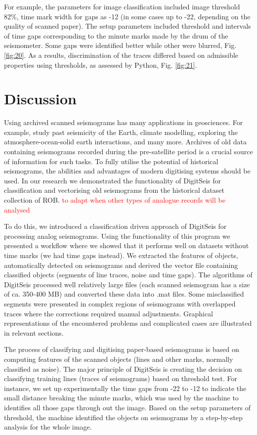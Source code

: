 \documentclass[informatics,article,submit,moreauthors,pdftex]{Definitions/mdpi}
\begin{document}
For example, the parameters for image classification included image threshold 82\%, time mark width for gaps as -12 (in some cases up to -22, depending on the quality of scanned paper). The setup parameters included threshold and intervals of time gaps corresponding to the minute marks made by the drum of the seismometer. Some gaps were identified better while other were blurred, Fig. \ref{fig:20}. As a results, discrimination of the traces differed based on admissible properties using thresholds, as assessed by Python, Fig. \ref{fig:21}. 

\section{Discussion}

Using archived scanned seismograms has many applications in geosciences. For example, study past seismicity of the Earth, climate modelling, exploring the atmosphere-ocean-solid earth interactions, and many more. Archives of old data containing seismograms recorded during the pre-satellite period is a crucial source of information for such tasks. To fully utilise the potential of historical seismograms, the abilities and advantages of modern digitising systems should be used. In our research we demonstrated the functionality of DigitSeis for classification and vectorising old seismograms from the historical dataset collection of \ac{ROB}. \textcolor{red}{to adapt when other types of analogue records will be analysed}

To do this, we introduced a classification driven approach of DigitSeis for processing analog seismograms. Using the functionality of this program we presented a workflow where we showed that it performs well on datasets without time marks (we had time gaps instead). We extracted the features of objects, automatically detected on seismograms and derived the vector file containing classified objects (segments of line traces, noise and time gaps). The algorithms of DigitSeis processed well relatively large files (each scanned seismogram has a size of ca. 350-400 MB) and converted these data into .mat files. Some misclassified segments were presented in complex regions of seismograms with overlapped traces where the corrections required manual adjustments. Graphical representations of the encountered problems and complicated cases are illustrated in relevant sections. 

The process of classifying and digitising paper-based seismograms is based on computing features of the scanned objects (lines and other marks, normally classified as noise). The major principle of DigitSeis is creating the decision on classifying training lines (traces of seismograms) based on threshold test. For instance, we set up experimentally the time gaps from -22 to -12 to indicate the small distance breaking the minute marks, which was used by the machine to identifies all those gaps through out the image. Based on the setup parameters of threshold, the machine identified the objects on seismograms by a step-by-step analysis for the whole image.
\end{document}
